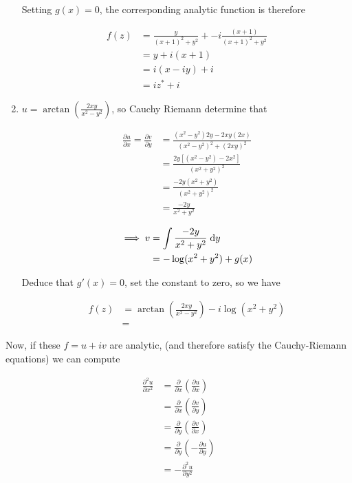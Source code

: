 \documentclass[a4paper]{article}
\begin{document}
\begin{enumerate}
	Setting $ g(x) = 0 $, the corresponding analytic function is therefore
	
	\begin{align*}
	f(z) & = \frac{y}{(x+1)^{2} + y^{2}}  + - i \frac{(x+1)}{(x+1)^{2} + y^{2}} \\
	& = y + i(x+1) \\
	& = i(x - iy) + i \\
	& = i z^{*} + i
	\end{align*}
	
	\item $ u = \arctan\left(   \frac{2xy}{x^{2} - y^{2}} \right)   $, so Cauchy Riemann determine that
	
	
	
	\begin{align*}
	\frac{\partial u }{\partial x} = \frac{\partial v }{\partial y} & = \frac{(x^{2} - y^{2})2y - 2xy(2x)}{(x^{2} - y^{2})^{2} + (2xy)^{2}  }   \\
	& = \frac{2y[(x^{2} - y^{2}) - 2x^{2}]}{(x^{2} + y^{2})^{2} } \\
	& = \frac{-2y(x^{2} + y^{2})}{(x^{2} + y^{2})^{2} } \\
	& = \frac{-2y}{x^{2} + y^{2} }
	\end{align*}
	
	\begin{align*}
	\implies v & = \int \frac{-2y}{x^{2} + y^{2} }\; \mathrm{d} y \\
	& = - \log ( x^{2} + y^{2} ) + g(x) \\	
	\end{align*}
	
	Deduce that $ g'(x) = 0 $, set the constant to zero, so we have 
	
	\begin{align*}
	f(z) & = \arctan\left(   \frac{2xy}{x^{2} - y^{2}} \right)  - i \log ( x^{2} + y^{2} ) \\
	& = 
	\end{align*}
		
	
\end{enumerate}


Now, if these $ f = u + iv $ are analytic, (and therefore satisfy the Cauchy-Riemann equations) we can compute

\begin{align*}
\frac{\partial^{2} u}{\partial x^{2}} & = \frac{\partial }{\partial x} \left(  \frac{\partial u }{\partial x} \right)  \\
& = \frac{\partial }{\partial x} \left(  \frac{\partial v }{\partial y} \right)\\
& = \frac{\partial }{\partial y} \left(  \frac{\partial v }{\partial x} \right)\\
& = \frac{\partial }{\partial y} \left(  - \frac{\partial u }{\partial y} \right)\\
& =  - \frac{\partial^{2} u }{\partial y^{2}}  \\
\end{align*}
\end{document}
